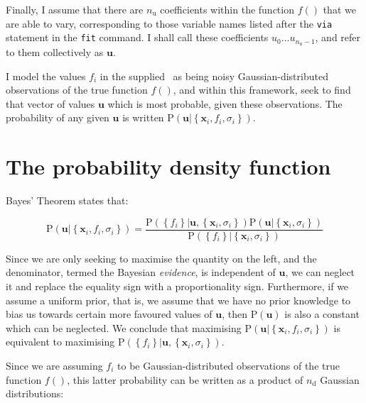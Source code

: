 Finally, I assume that there are $n_\mathrm{u}$ coefficients within the
function $f()$ that we are able to vary, corresponding to those variable names
listed after the {\tt via} statement in the {\tt fit} command. I shall
call these coefficients $u_0$...$u_{n_\mathrm{u}-1}$, and refer to them
collectively as $\mathbf{u}$.

I model the values $f_i$ in the supplied \datafile\ as being noisy
Gaussian-distributed observations of the true function $f()$, and within this
framework, seek to find that vector of values $\mathbf{u}$ which is most
probable, given these observations. The probability of any given $\mathbf{u}$
is written
$\mathrm{P}\left( \mathbf{u} | \left\{ \mathbf{x}_i, f_i, \sigma_i \right\} \right)$.

\section{The probability density function}
\label{sec:bayes_pdf}

Bayes' Theorem states that:

\begin{equation}
\mathrm{P}\left( \mathbf{u} | \left\{ \mathbf{x}_i, f_i, \sigma_i \right\} \right) =
\frac{
\mathrm{P}\left( \left\{f_i \right\} | \mathbf{u}, \left\{ \mathbf{x}_i, \sigma_i \right\} \right)
\mathrm{P}\left( \mathbf{u} | \left\{ \mathbf{x}_i, \sigma_i \right\} \right)
}{
\mathrm{P}\left( \left\{f_i \right\} | \left\{ \mathbf{x}_i, \sigma_i \right\} \right)
}
\end{equation}

Since we are only seeking to maximise the quantity on the left, and the
denominator, termed the Bayesian \textit{evidence}, is independent of
$\mathbf{u}$, we can neglect it and replace the equality sign with a
proportionality sign.  Furthermore, if we assume a uniform prior, that is, we
assume that we have no prior knowledge to bias us towards certain more favoured
values of $\mathbf{u}$, then $\mathrm{P}\left( \mathbf{u} \right)$ is also a
constant which can be neglected. We conclude that maximising $\mathrm{P}\left(
\mathbf{u} | \left\{ \mathbf{x}_i, f_i, \sigma_i \right\} \right)$ is
equivalent to maximising $\mathrm{P}\left( \left\{f_i \right\} | \mathbf{u},
\left\{ \mathbf{x}_i, \sigma_i \right\} \right)$.

Since we are assuming $f_i$ to be Gaussian-distributed observations of the true
function $f()$, this latter probability can be written as a product of
$n_\mathrm{d}$ Gaussian distributions:

